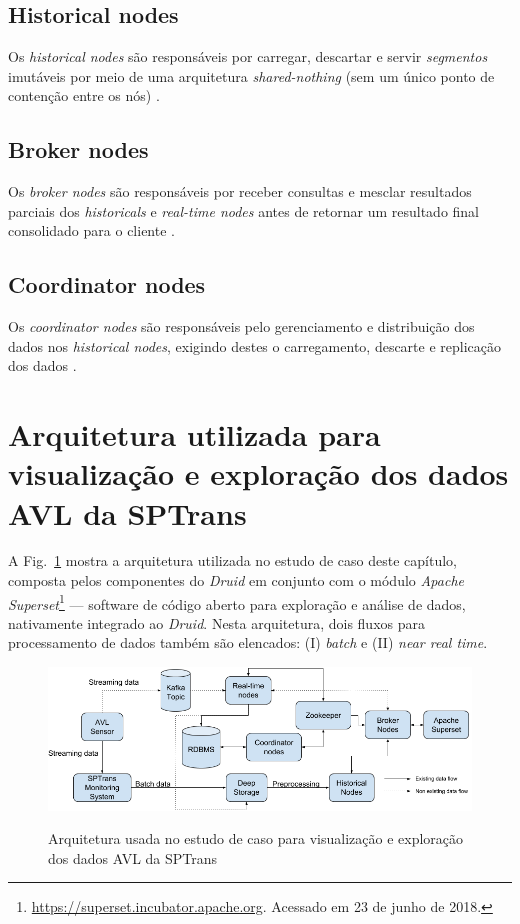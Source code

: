 \documentclass[
	12pt,				%
	oneside,			%
	a4paper,			%
	english,			%
	brazil				%
	]{abntex2ppgsi}
\begin{document}
\subsection{Historical nodes}

Os \textit{historical nodes} são responsáveis por carregar, descartar e servir \emph{segmentos} imutáveis por meio de uma arquitetura \textit{shared-nothing} (sem um único ponto de contenção entre os nós) \cite{yang2014druid}.

\subsection{Broker nodes}

Os \textit{broker nodes} são responsáveis por receber consultas e mesclar resultados parciais dos \textit{historicals} e \textit{real-time nodes} antes de retornar um resultado final consolidado para o cliente \cite{yang2014druid}.

\subsection{Coordinator nodes}

Os \textit{coordinator nodes} são responsáveis pelo gerenciamento e distribuição dos dados nos \textit {historical nodes}, exigindo destes o carregamento, descarte e replicação dos dados \cite{yang2014druid}.

\section{Arquitetura utilizada para visualização e exploração dos dados AVL da SPTrans}
\label{arch_viz}

A Fig.~\ref{fig:viz_arch} mostra a arquitetura utilizada no estudo de caso deste capítulo, composta pelos componentes do \textit{Druid} em conjunto com o módulo \textit {Apache Superset}\footnote{\url{https://superset.incubator.apache.org}. Acessado em 23 de junho de 2018.} --- software de código aberto para exploração e análise de dados, nativamente integrado ao \textit{Druid}. Nesta arquitetura, dois fluxos para processamento de dados também são elencados: (I) \textit{batch} e (II) \textit{near real time}.

\begin{figure}[!htb]%
	\centering
 	  \caption{Arquitetura usada no estudo de caso para visualização e exploração dos dados AVL da SPTrans}
		\includegraphics[width=1\linewidth]{images/viz_arch.png}
	\label{fig:viz_arch}
\end{figure}
\end{document}
